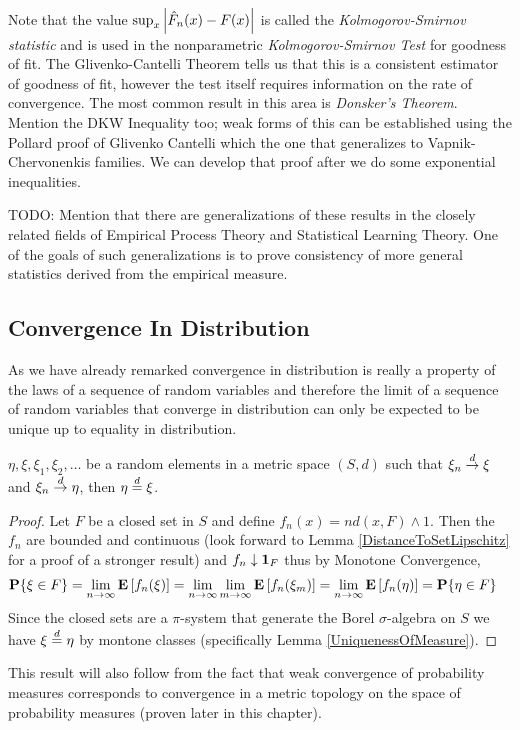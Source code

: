 Note that the value $\sup_x \left \vert \hat{F}_n(x) - F(x) \right \vert$ is called the
\emph{Kolmogorov-Smirnov statistic} and is used in the nonparametric
\emph{Kolmogorov-Smirnov Test} for goodness of fit.  The
Glivenko-Cantelli Theorem tells us that this is a consistent estimator
of goodness of fit, however the test itself requires information on
the rate of convergence.  The most common result in this area is
\emph{Donsker's Theorem}.  Mention the DKW Inequality too; weak forms
of this can be established using the Pollard proof of Glivenko
Cantelli which the one that generalizes to Vapnik-Chervonenkis
families.  We can develop that proof after we do some exponential inequalities.

TODO: Mention that there are generalizations of these results in the
closely related fields of Empirical Process Theory and Statistical
Learning Theory.  One of the goals of such generalizations is to prove
consistency of more general statistics derived from the empirical measure.

\subsection{Convergence In Distribution}
As we have already remarked convergence in distribution is really a
property of the laws of a sequence of random variables and therefore
the limit of a sequence of random variables that converge in
distribution can only be expected to be unique up to equality in
distribution.
\begin{lem}\label{UniquenessOfConvergenceInDistribution}$\eta, \xi, \xi_1, \xi_2, \dots$ be a random elements in a
  metric space $(S,d)$ such that $\xi_n \overset{d}\to \xi$ and $\xi_n
  \overset{d}\to \eta$, then $\eta \overset{d}= \xi$.
\end{lem}
\begin{proof}
Let $F$ be a closed set in $S$ and define $f_n(x) = nd(x,F) \wedge
1$.  Then the $f_n$ are bounded and continuous (look forward to Lemma
\ref{DistanceToSetLipschitz} for a proof of a stronger result) and
$f_n \downarrow \textbf{1}_{F}$ thus by Monotone Convergence,
\begin{align*}
\textbf{P}\{\xi \in F\} &= \lim_{n \to \infty} \textbf{E}\left[f_n(\xi)\right]=
\lim_{n \to \infty} \lim_{m \to \infty} \textbf{E}\left[f_n(\xi_m)\right] =  \lim_{n \to \infty} \textbf{E}\left[f_n(\eta)\right]=\textbf{P}\{\eta \in F\} 
\end{align*}
Since the closed sets are a $\pi$-system that generate the Borel
$\sigma$-algebra on $S$ we have $\xi \overset{d}= \eta$ by montone classes
(specifically Lemma \ref{UniquenessOfMeasure}).
\end{proof}
This result will also follow from the fact that weak convergence of
probability measures corresponds to convergence in a metric topology on the space
of probability measures (proven later in this chapter).

